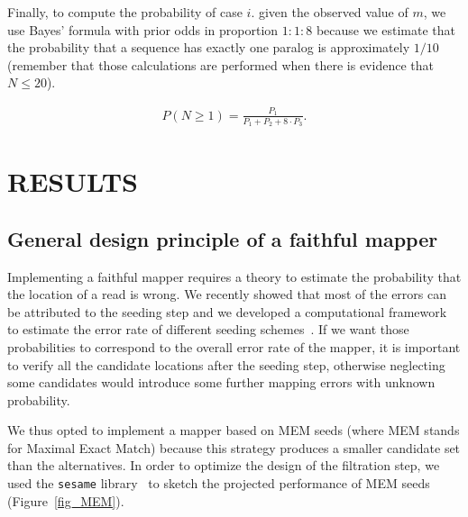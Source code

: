 \documentclass[a4,center,fleqn]{NAR}
\begin{document}
Finally, to compute the probability of case $i.$ given the observed value
of $m$, we use Bayes' formula with prior odds in proportion $1:1:8$ because
we estimate that the probability that a sequence has exactly one paralog
is approximately $1/10$ (remember that those calculations are performed
when there is evidence that $N \leq 20$).

\begin{align*}
P(N \geq 1) = \frac{P_1}{P_1 + P_2 + 8\cdot P_3}.
\end{align*}


\section{RESULTS}

\subsection{General design principle of a faithful mapper}

Implementing a faithful mapper requires a theory to estimate the
probability that the location of a read is wrong. We recently showed that
most of the errors can be attributed to the seeding step and we developed
a computational framework to estimate the error rate of different seeding
schemes~\cite{Filion619155}. If we want those probabilities to correspond
to the overall error rate of the mapper, it is important to verify all the
candidate locations after the seeding step, otherwise neglecting some
candidates would introduce some further mapping errors with unknown
probability.

We thus opted to implement a mapper based on MEM seeds (where MEM stands
for Maximal Exact Match) because this strategy produces a smaller
candidate set than the alternatives. In order to optimize the design of
the filtration step, we used the \texttt{sesame}
library~\cite{Filion619155} to sketch the projected performance of MEM
seeds (Figure~\ref{fig_MEM}).
\end{document}
